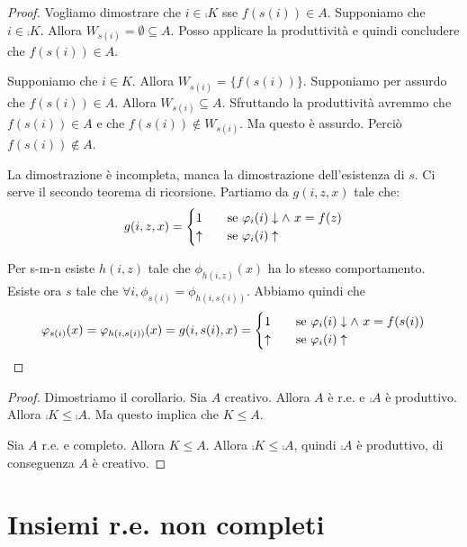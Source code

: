 \begin{proof}
    Vogliamo dimostrare che $i \in \comp{K}$ sse $f(s(i)) \in A$. Supponiamo che $i \in \comp{K}$.
    Allora $W_{s(i)} = \emptyset \subseteq A$. Posso applicare la produttività e quindi concludere
    che $f(s(i)) \in A$.

    Supponiamo che $i \in K$. Allora $W_{s(i)} = \{f(s(i))\}$. Supponiamo per assurdo che $f(s(i)) \in A$.
    Allora $W_{s(i)} \subseteq A$. Sfruttando la produttività avremmo che $f(s(i)) \in A$ e che
    $f(s(i)) \notin W_{s(i)}$. Ma questo è assurdo. Perciò $f(s(i)) \notin A$.

    La dimostrazione è incompleta, manca la dimostrazione dell'esistenza di $s$. Ci serve il secondo
    teorema di ricorsione. Partiamo da $g(i,z,x)$ tale che:
    \begin{equation*}
        g(i,z,x) =
        \begin{cases}
            1 \quad &\text{se $\varphi_{i}(i) \downarrow \land$ $x = f(z)$} \\
            \uparrow \quad &\text{se $\varphi_{i}(i) \uparrow$}
        \end{cases}
    \end{equation*}
    
    Per s-m-n esiste $h(i,z)$ tale che $\phi_{h(i,z)}(x)$ ha lo stesso comportamento. Esiste ora $s$ tale che
    $\forall i, \phi_{s(i)} = \phi_{h(i,s(i))}$. Abbiamo quindi che
    \begin{equation*}
        \varphi_{s(i)}(x) = \varphi_{h(i,s(i))}(x) = g(i,s(i),x) =
        \begin{cases}
            1 \quad &\text{se $\varphi_{i}(i) \downarrow \land$ $x = f(s(i))$} \\
            \uparrow \quad &\text{se $\varphi_{i}(i) \uparrow$}
        \end{cases}
    \end{equation*}
\end{proof}

\begin{proof}
    Dimostriamo il corollario. Sia $A$ creativo. Allora $A$ è r.e. e $\comp{A}$ è produttivo. Allora
    $\comp{K} \leq \comp{A}$. Ma questo implica che $K \leq A$.

    Sia $A$ r.e. e completo. Allora $K \leq A$. Allora $\comp{K} \leq \comp{A}$, quindi $\comp{A}$ è
    produttivo, di conseguenza $A$ è creativo.
\end{proof}

\section{Insiemi r.e. non completi}

